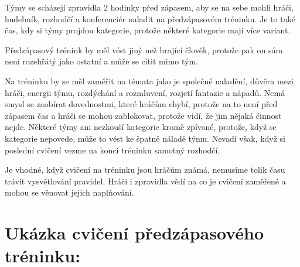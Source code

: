 \needspace{5cm} \label{předzápasový trénink} Týmy se scházejí zpravidla 2 hodinky před zápasem, aby se na sebe mohli hráči, hudebník, rozhodčí a konferenciér naladit na předzápasovém tréninku. Je to také čas, kdy si týmy projdou kategorie, protože některé kategorie mají více variant. 
 
Předzápasový trénink by měl vést jiný než hrající člověk, protože pak on sám není rozehřátý jako ostatní a může se cítit mimo tým. 
 
Na tréninku by se měl  zaměřit na témata jako je společné naladění, důvěra mezi hráči, energii týmu, rozdýchání a rozmluvení, rozjetí fantazie a nápadů. Nemá smysl se zaobírat dovednostmi, které hráčům chybí, protože na to není před zápasem čas a hráči se mohou zablokovat, protože vidí, že jim nějaká činnost nejde. 
Některé týmy ani nezkouší kategorie kromě zpívané, protože, když se kategorie nepovede, může to vést ke špatně náladě týmu. Nevadí však, když si poslední cvičení vezme na konci tréninku samotný rozhodčí. 
 
Je vhodné, když cvičení na tréninku jsou hráčům známá, nemusíme tolik času trávit vysvětlování pravidel. 
Hráči i zpravidla vědí na co je cvičení zaměřené a mohou se věnovat jejich naplňování. 
 
 
\section{ Ukázka cvičení předzápasového tréninku: }  
 

